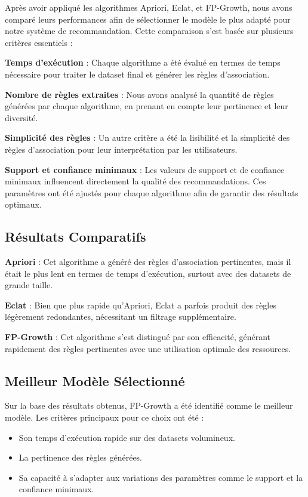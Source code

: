 \documentclass[a4paper, 12pt]{article}
\begin{document}
Après avoir appliqué les algorithmes Apriori, Eclat, et FP-Growth, nous avons comparé leurs performances afin de sélectionner le modèle le plus adapté pour notre système de recommandation. Cette comparaison s'est basée sur plusieurs critères essentiels :

   \textbf{Temps d'exécution} : Chaque algorithme a été évalué en termes de temps nécessaire pour traiter le dataset final et générer les règles d'association.

    \textbf{Nombre de règles extraites} : Nous avons analysé la quantité de règles générées par chaque algorithme, en prenant en compte leur pertinence et leur diversité.

    \textbf{Simplicité des règles} : Un autre critère a été la lisibilité et la simplicité des règles d'association pour leur interprétation par les utilisateurs.

   \textbf{Support et confiance minimaux} : Les valeurs de support et de confiance minimaux influencent directement la qualité des recommandations. Ces paramètres ont été ajustés pour chaque algorithme afin de garantir des résultats optimaux.

\subsection{Résultats Comparatifs}

    \textbf{Apriori} : Cet algorithme a généré des règles d'association pertinentes, mais il était le plus lent en termes de temps d'exécution, surtout avec des datasets de grande taille.

    \textbf{Eclat} : Bien que plus rapide qu’Apriori, Eclat a parfois produit des règles légèrement redondantes, nécessitant un filtrage supplémentaire.

    \textbf{FP-Growth} : Cet algorithme s’est distingué par son efficacité, générant rapidement des règles pertinentes avec une utilisation optimale des ressources.

\subsection{Meilleur Modèle Sélectionné}

Sur la base des résultats obtenus, FP-Growth a été identifié comme le meilleur modèle. Les critères principaux pour ce choix ont été :
\begin{itemize}[label=\textbullet]
    \item Son temps d'exécution rapide sur des datasets volumineux.
    \item La pertinence des règles générées.
    \item Sa capacité à s’adapter aux variations des paramètres comme le support et la confiance minimaux.
\end{itemize}
\end{document}
